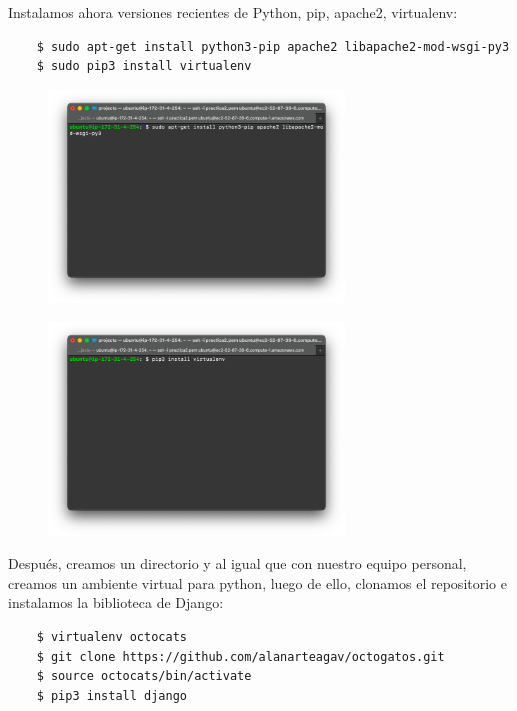 \documentclass{article}
\begin{document}
\begin{enumerate}
    Instalamos ahora versiones recientes de Python, pip, apache2, virtualenv:

    \begin{lstlisting}
    $ sudo apt-get install python3-pip apache2 libapache2-mod-wsgi-py3
    $ sudo pip3 install virtualenv
    \end{lstlisting}
    \begin{figure}[H]
      \centering
      \includegraphics[width=0.70\textwidth]{AppServer/i3}
    \end{figure}
    \begin{figure}[H]
      \centering
      \includegraphics[width=0.70\textwidth]{AppServer/i4}
    \end{figure}

    Después, creamos un directorio y al igual que con nuestro equipo personal,
    creamos un ambiente virtual para python, luego de ello, clonamos el
    repositorio e instalamos la biblioteca de Django:

    \begin{lstlisting}
    $ virtualenv octocats
    $ git clone https://github.com/alanarteagav/octogatos.git
    $ source octocats/bin/activate
    $ pip3 install django
    \end{lstlisting}


\end{enumerate}
\end{document}
